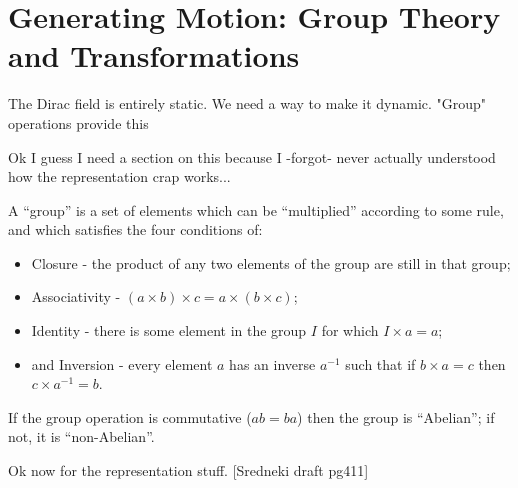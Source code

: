 





\section{Generating Motion: Group Theory and Transformations}

    The Dirac field is entirely static. We need a way to make it dynamic. "Group" operations provide this
    
    Ok I guess I need a section on this because I -forgot- never actually understood how the representation crap works...

    A ``group'' is a set of elements which can be ``multiplied'' according to some rule,
        and which satisfies the four conditions of:
            \begin{itemize}
                \item Closure - the product of any two elements of the group are still in that group;
                \item Associativity - $(a \times b)\times c = a\times(b \times c)$;
                \item Identity - there is some element in the group $I$ for which $I \times a=a$;
                \item and Inversion - every element $a$ has an inverse $a^{-1}$ such that if $b \times a = c$ then $c \times a^{-1} = b$.
            \end{itemize}

    If the group operation is commutative ($ab=ba$) then the group is ``Abelian''; if not, it is ``non-Abelian''.

    Ok now for the representation stuff. [Sredneki draft pg411]

